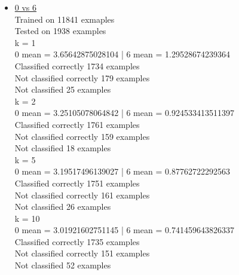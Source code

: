 \documentclass[11pt]{article}
\theoremstyle{definition}
\theoremstyle{definition}
\begin{document}
\begin{itemize}
	\item
		\underline{0 vs 6}\\
Trained on 11841 exmaples\\
Tested on  1938 examples\\
k = 1\\
0 mean = 3.65642875028104 | 6 mean = 1.29528674239364\\
Classified correctly 1734 examples\\
Not classified correctly 179 examples\\
Not classified 25 examples\\
k = 2\\
0 mean = 3.25105078064842 | 6 mean = 0.924533413511397\\
Classified correctly 1761 examples\\
Not classified correctly 159 examples\\
Not classified 18 examples\\
k = 5\\
0 mean = 3.19517496139027 | 6 mean = 0.87762722292563\\
Classified correctly 1751 examples\\
Not classified correctly 161 examples\\
Not classified 26 examples\\
k = 10\\
0 mean = 3.01921602751145 | 6 mean = 0.741459643826337\\
Classified correctly 1735 examples\\
Not classified correctly 151 examples\\
Not classified 52 examples


\end{itemize}
\end{document}
